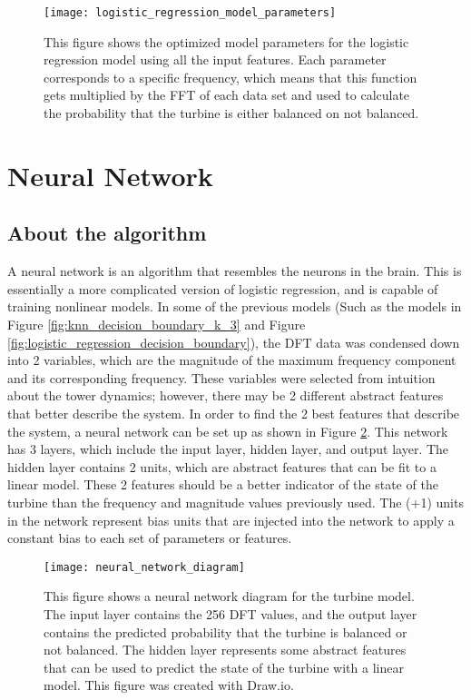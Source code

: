 \begin{figure}
	\centering
	\texttt{[image: logistic\_regression\_model\_parameters]}
	\decoRule
	\caption{This figure shows the optimized model parameters for the logistic regression model using all the input features.  Each parameter corresponds to a specific frequency, which means that this function gets multiplied by the FFT of each data set and used to calculate the probability that the turbine is either balanced on not balanced.}
	\label{fig:logistic_regression_model_parameters}
\end{figure}

\section{Neural Network}

\subsection{About the algorithm}
A neural network is an algorithm that resembles the neurons in the brain.  This is essentially a more complicated version of logistic regression, and is capable of training nonlinear models.  In some of the previous models (Such as the models in Figure \ref{fig:knn_decision_boundary_k_3} and Figure \ref{fig:logistic_regression_decision_boundary}), the DFT data was condensed down into 2 variables, which are the magnitude of the maximum frequency component and its corresponding frequency.  These variables were selected from intuition about the tower dynamics; however, there may be 2 different abstract features that better describe the system.  In order to find the 2 best features that describe the system, a neural network can be set up as shown in Figure \ref{fig:neural_network_diagram}.  This network has 3 layers, which include the input layer, hidden layer, and output layer.  The hidden layer contains 2 units, which are abstract features that can be fit to a linear model.  These 2 features should be a better indicator of the state of the turbine than the frequency and magnitude values previously used.  The (+1) units in the network represent bias units that are injected into the network to apply a constant bias to each set of parameters or features.

\begin{figure}
\centering
\texttt{[image: neural\_network\_diagram]}
\decoRule
\caption{This figure shows a neural network diagram for the turbine model.  The input layer contains the 256 DFT values, and the output layer contains the predicted probability that the turbine is balanced or not balanced.  The hidden layer represents some abstract features that can be used to predict the state of the turbine with a linear model.  This figure was created with Draw.io.}
\label{fig:neural_network_diagram}
\end{figure}

